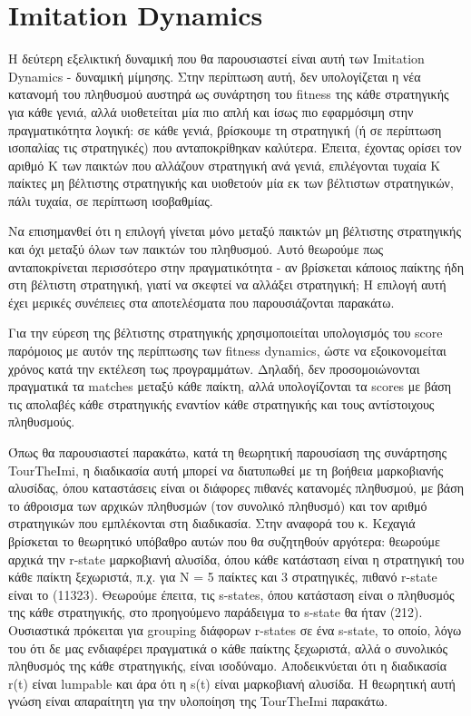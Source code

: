 \documentclass[12pt]{article}
\begin{document}
\clearpage
\section{Imitation Dynamics}
Η δεύτερη εξελικτική δυναμική που θα παρουσιαστεί είναι αυτή των Imitation Dynamics - δυναμική μίμησης. Στην περίπτωση αυτή, δεν υπολογίζεται η νέα κατανομή του πληθυσμού αυστηρά ως συνάρτηση του fitness της κάθε στρατηγικής για κάθε γενιά, αλλά υιοθετείται μία πιο απλή και ίσως πιο εφαρμόσιμη στην πραγματικότητα λογική: σε κάθε γενιά, βρίσκουμε τη στρατηγική (ή σε περίπτωση ισοπαλίας τις στρατηγικές) που ανταποκρίθηκαν καλύτερα. Έπειτα, έχοντας ορίσει τον αριθμό K των παικτών που αλλάζουν στρατηγική ανά γενιά, επιλέγονται τυχαία K παίκτες μη βέλτιστης στρατηγικής και υιοθετούν μία εκ των βέλτιστων στρατηγικών, πάλι τυχαία, σε περίπτωση ισοβαθμίας. 

Να επισημανθεί ότι η επιλογή γίνεται μόνο μεταξύ παικτών μη βέλτιστης στρατηγικής και όχι μεταξύ όλων των παικτών του πληθυσμού. Αυτό θεωρούμε πως ανταποκρίνεται περισσότερο στην πραγματικότητα - αν βρίσκεται κάποιος παίκτης ήδη στη βέλτιστη στρατηγική, γιατί να σκεφτεί να αλλάξει στρατηγική; Η επιλογή αυτή έχει μερικές συνέπειες στα αποτελέσματα που παρουσιάζονται παρακάτω.

Για την εύρεση της βέλτιστης στρατηγικής χρησιμοποιείται υπολογισμός του score παρόμοιος με αυτόν της περίπτωσης των fitness dynamics, ώστε να εξοικονομείται χρόνος κατά την εκτέλεση τως προγραμμάτων. Δηλαδή, δεν προσομοιώνονται πραγματικά τα matches μεταξύ κάθε παίκτη, αλλά υπολογίζονται τα scores με βάση τις απολαβές κάθε στρατηγικής εναντίον κάθε στρατηγικής και τους αντίστοιχους πληθυσμούς.

Όπως θα παρουσιαστεί παρακάτω, κατά τη θεωρητική παρουσίαση της συνάρτησης TourTheImi, η διαδικασία αυτή μπορεί να διατυπωθεί με τη βοήθεια μαρκοβιανής αλυσίδας, όπου καταστάσεις είναι οι διάφορες πιθανές κατανομές πληθυσμού, με βάση το άθροισμα των αρχικών πληθυσμών (τον συνολικό πληθυσμό) και τον αριθμό στρατηγικών που εμπλέκονται στη διαδικασία. Στην αναφορά του κ. Κεχαγιά βρίσκεται το θεωρητικό υπόβαθρο αυτών που θα συζητηθούν αργότερα: θεωρούμε αρχικά την r-state μαρκοβιανή αλυσίδα, όπου κάθε κατάσταση είναι η στρατηγική του κάθε παίκτη ξεχωριστά, π.χ. για N = 5 παίκτες και 3 στρατηγικές, πιθανό r-state είναι το (11323). Θεωρούμε έπειτα, τις s-states, όπου κατάσταση είναι ο πληθυσμός της κάθε στρατηγικής, στο προηγούμενο παράδειγμα το s-state θα ήταν (212). Ουσιαστικά πρόκειται για grouping διάφορων r-states σε ένα s-state, το οποίο, λόγω του ότι δε μας ενδιαφέρει πραγματικά ο κάθε παίκτης ξεχωριστά, αλλά ο συνολικός πληθυσμός της κάθε στρατηγικής, είναι ισοδύναμο. Αποδεικνύεται ότι η διαδικασία r(t) είναι lumpable και άρα ότι η s(t) είναι μαρκοβιανή αλυσίδα. Η θεωρητική αυτή γνώση είναι απαραίτητη για την υλοποίηση της TourTheImi παρακάτω.
\end{document}
